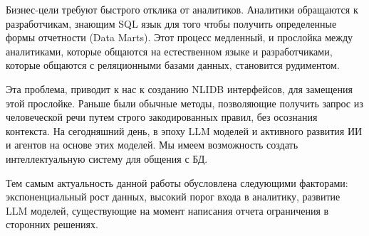 
Бизнес-цели требуют быстрого отклика от аналитиков. Аналитики обращаются к разработчикам, знающим SQL язык для того чтобы получить определенные формы отчетности (Data Marts). Этот процесс медленный, и прослойка между аналитиками, которые общаются на естественном языке и разработчиками, которые общаются с реляционными базами данных, становится рудиментом.

Эта проблема, приводит к нас к созданию NLIDB интерфейсов, для замещения этой прослойке. Раньше были обычные методы, позволяющие получить запрос из человеческой речи путем строго закодированных правил, без осознания контекста. На сегодняшний день, в эпоху LLM моделей и активного развития ИИ и агентов на основе этих моделей. Мы имеем возможность создать интеллектуальную систему для общения с БД.

Тем самым актуальность данной работы обусловлена следующими факторами: экспоненциальный рост данных, высокий порог входа в аналитику, развитие LLM моделей, существующие на момент написания отчета ограничения в сторонних решениях.
